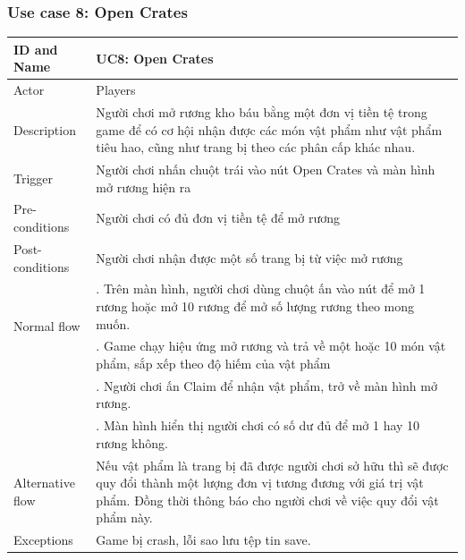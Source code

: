 \subsubsection{Use case 8: Open Crates}
\begin{center}
	\begin{tabular}{|l|p{12cm}|}
		\hline
		ID and Name & UC8: Open Crates \\
		\hline
		Actor  & Players \\
		\hline
		Description  & Người chơi mở rương kho báu bằng một đơn vị tiền tệ trong game để có cơ hội nhận được các món vật phẩm như vật phẩm tiêu hao, cũng như trang bị theo các phân cấp khác nhau.\\
		\hline
		Trigger  & Người chơi nhấn chuột trái vào nút Open Crates và màn hình mở rương hiện ra\\
		\hline
		Pre-conditions & Người chơi có đủ đơn vị tiền tệ để mở rương\\
		\hline
		Post-conditions & Người chơi nhận được một số trang bị từ việc mở rương\\
		\hline
		\multirow{2}{*}{Normal flow}      &\qquad 1. Trên màn hình, người chơi dùng chuột ấn vào nút để mở 1 rương hoặc mở 10 rương để mở số lượng rương theo mong muốn.\\
		&\qquad 2. Game chạy hiệu ứng mở rương và trả về một hoặc 10 món vật phẩm, sắp xếp theo độ hiếm của vật phẩm\\
		&\qquad 3. Người chơi ấn Claim để nhận vật phẩm, trở về màn hình mở rương. \\
		&\qquad 4. Màn hình hiển thị người chơi có số dư đủ để mở 1 hay 10 rương không.\\
		\hline
		Alternative flow  & Nếu vật phẩm là trang bị đã được người chơi sở hữu thì sẽ được quy đổi thành một lượng đơn vị tương đương với giá trị vật phẩm. Đồng thời thông báo cho người chơi về việc quy đổi vật phẩm này.\\
		\hline
		Exceptions  & Game bị crash, lỗi sao lưu tệp tin save.\\
		\hline
	\end{tabular}
\end{center}
